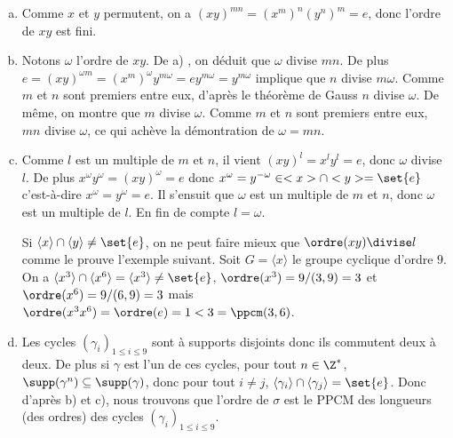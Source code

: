 \begin{enumerate}[a)]
\item
  Comme $x$ et $y$ permutent, on a $(xy)^{mn} = (x^m)^n(y^n)^m = e$, donc l'ordre de
  $xy$ est fini.

\item
  Notons $\omega$ l'ordre de $xy$. De a) , on déduit que
  $\omega$ divise $mn$. De plus
  $e =(xy)^{\omega m} = (x^m)^\omega y^{m\omega} = e y^{m\omega} = y^{m\omega}$
  implique que $n$ divise $m\omega$. Comme $m$ et $n$ sont premiers entre eux,
  d'après le théorème de Gauss $n$ divise $\omega$. De même, on montre que
  $m$ divise $\omega$. Comme $m$ et $n$ sont premiers entre eux, $mn$ divise
  $\omega$, ce qui achève la démontration de $\omega = mn$.

\item
  Comme $l$ est un multiple de $m$ et $n$, il vient $(xy)^l = x^l y^l = e$, donc
  $\omega$ divise $l$. De plus $x^\omega y^\omega = (xy)^\omega = e$  donc
  $x^\omega = y^{-\omega}\in<x>\cap<y> = \set{e}$ c'est-à-dire $x^\omega =
  y^\omega = e$. Il s'ensuit que $\omega$ est un multiple de $m$ et $n$, donc
  $\omega$ est un multiple de $l$.  En fin de compte $l = \omega$.

  Si $\langle x \rangle\cap\langle y \rangle\neq\set{e}$,
  on ne peut faire mieux que $\ordre(xy)\divise l$ comme le prouve l'exemple
  suivant. Soit $G = \langle x \rangle$ le groupe cyclique d'ordre $9$. On a
  $\langle x^3\rangle\cap\langle x^6\rangle = \langle x^3\rangle\neq\set{e}$,
  $\ordre(x^3) = 9/(3,9) = 3$ et $\ordre(x^6) = 9/(6,9) = 3$ mais
  $\ordre(x^3 x^6)=\ordre(e) = 1 < 3 = \ppcm(3,6)$.

\item
  Les cycles $(\gamma_i)_{1\leq i\leq 9}$ sont à supports disjoints
  donc ils commutent deux à deux. De plus si $\gamma$ est l'un de ces cycles,
  pour tout $n\in\Z^*$, $\supp(\gamma^n)\subseteq\supp(\gamma)$, donc pour tout
  $i\neq j$, $\langle\gamma_i\rangle\cap\langle\gamma_j\rangle=\set{e}$. Donc
  d'après b) et c), nous trouvons que l'ordre de $\sigma$ est le PPCM des
  longueurs (des ordres) des cycles $(\gamma_i)_{1\leq i\leq 9}$.
\end{enumerate}

